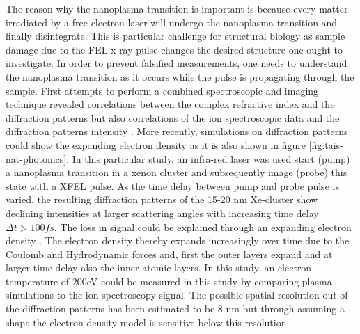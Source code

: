 The reason why the nanoplasma transition is important is because every matter irradiated by a free-electron laser will undergo the nanoplasma transition and finally disintegrate. This is particular challenge for structural biology \citep{Neutze-2000-Nature} as sample damage due to the FEL x-ray pulse changes the desired structure one ought to investigate. In order to prevent falsified measurements, one needs to understand the nanoplasma transition as it occurs while the pulse is propagating through the sample. First attempts to perform a combined spectroscopic and imaging technique revealed correlations between the complex refractive index \citep{Bostedt-2012-PRL} and the diffraction patterns but also correlations of the ion spectroscopic data and the diffraction patterns intensity \citep{Gorkhover-2012-PRL}. More recently, simulations on diffraction patterns could show the expanding electron density \citep{Gorkhover-2016-NatPho} as it is also shown in figure \ref{fig:tais-nat-photonics}. In this particular study, an infra-red laser was used start (pump) a nanoplasma transition in a xenon cluster and subsequently image (probe) this state with a XFEL pulse. As the time delay between pump and probe pulse is varied, the resulting diffraction patterns of the 15-20 nm Xe-cluster show declining intensities at larger scattering angles with increasing time delay $\Delta t>100 fs$. The loss in signal could be explained through an expanding electron density \citep{Hau-Riege-2008-PRE,Peltz-2014-PRL}. The electron density thereby expands increasingly over time due to the Coulomb and Hydrodynamic forces and, first the outer layers expand and at larger time delay also the inner atomic layers. In this study, an electron temperature of 200eV could be measured in this study by comparing plasma simulations to the ion spectroscopy signal. The possible spatial resolution out of the diffraction patterns has been estimated to be 8 nm but through assuming a shape the electron density model is sensitive below this resolution.\\
